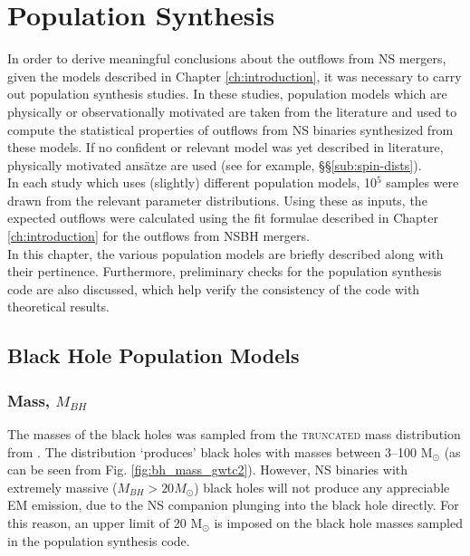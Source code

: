 \chapter{Population Synthesis}\label{ch:synthesis}

    In order to derive meaningful conclusions about the outflows from NS mergers, given
    the models described in Chapter \ref{ch:introduction}, it was necessary to carry out
    population synthesis studies. In these studies, population models which are
    physically or observationally motivated are taken from the literature and used to
    compute the statistical properties of outflows from NS binaries synthesized from
    these models. If no confident or relevant model was yet described in literature,
    physically motivated ans\"{a}tze are used (see for example,
    \S\S\ref{sub:spin-dists}).\\
    In each study which uses (slightly) different population models, 10$^5$ samples were
    drawn from the relevant parameter distributions. Using these as inputs, the expected
    outflows were calculated using the fit formulae described in Chapter
    \ref{ch:introduction} for the outflows from NSBH mergers.\\
    In this chapter, the various population models are briefly described along with
    their pertinence. Furthermore, preliminary checks for the population synthesis code
    are also discussed, which help verify the consistency of the code with theoretical
    results.

\section{Black Hole Population Models}\label{sec:bh_pop}

    \subsection{Mass, $M_{BH}$}
        The masses of the black holes was sampled from the \textsc{truncated} mass
        distribution from \cite{abbott_2020B}. The distribution `produces' black holes
        with masses between 3--100 M$_\odot$ (as can be seen from Fig.
        \ref{fig:bh_mass_gwtc2}).  However, NS binaries with extremely massive ($M_{BH}
        > 20 M_\odot$) black holes will not produce any appreciable EM emission, due to
        the NS companion plunging into the black hole directly. For this reason, an
        upper limit of 20 M$_\odot$ is imposed on the black hole masses sampled in the
        population synthesis code.

